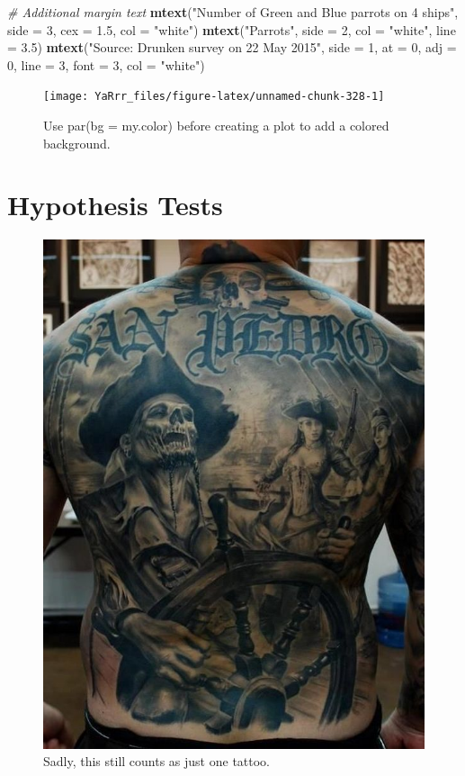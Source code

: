 \documentclass[]{book}
\newenvironment{Shaded}{\begin{snugshade}}{\end{snugshade}}
\newcommand{\KeywordTok}[1]{\textcolor[rgb]{0.13,0.29,0.53}{\textbf{#1}}}
\newcommand{\DataTypeTok}[1]{\textcolor[rgb]{0.13,0.29,0.53}{#1}}
\newcommand{\DecValTok}[1]{\textcolor[rgb]{0.00,0.00,0.81}{#1}}
\newcommand{\FloatTok}[1]{\textcolor[rgb]{0.00,0.00,0.81}{#1}}
\newcommand{\StringTok}[1]{\textcolor[rgb]{0.31,0.60,0.02}{#1}}
\newcommand{\CommentTok}[1]{\textcolor[rgb]{0.56,0.35,0.01}{\textit{#1}}}
\newcommand{\NormalTok}[1]{#1}
\theoremstyle{definition}
\theoremstyle{definition}
\theoremstyle{remark}
\begin{document}
\begin{Shaded}
\begin{Highlighting}[]
\CommentTok{# Additional margin text}
\KeywordTok{mtext}\NormalTok{(}\StringTok{"Number of Green and Blue parrots on 4 ships"}\NormalTok{, }
      \DataTypeTok{side =} \DecValTok{3}\NormalTok{, }\DataTypeTok{cex =} \FloatTok{1.5}\NormalTok{, }\DataTypeTok{col =} \StringTok{"white"}\NormalTok{)}
\KeywordTok{mtext}\NormalTok{(}\StringTok{"Parrots"}\NormalTok{, }\DataTypeTok{side =} \DecValTok{2}\NormalTok{, }\DataTypeTok{col =} \StringTok{"white"}\NormalTok{, }\DataTypeTok{line =} \FloatTok{3.5}\NormalTok{)}
\KeywordTok{mtext}\NormalTok{(}\StringTok{"Source: Drunken survey on 22 May 2015"}\NormalTok{, }\DataTypeTok{side =} \DecValTok{1}\NormalTok{,}
      \DataTypeTok{at =} \DecValTok{0}\NormalTok{, }\DataTypeTok{adj =} \DecValTok{0}\NormalTok{, }\DataTypeTok{line =} \DecValTok{3}\NormalTok{, }\DataTypeTok{font =} \DecValTok{3}\NormalTok{, }\DataTypeTok{col =} \StringTok{"white"}\NormalTok{)}
\end{Highlighting}
\end{Shaded}

\begin{figure}

{\centering \texttt{[image: YaRrr\_files/figure-latex/unnamed-chunk-328-1]} 

}

\caption{Use par(bg = my.color) before creating a plot to add a colored background.}\label{fig:unnamed-chunk-328}
\end{figure}

\chapter{Hypothesis Tests}\label{htests}

\begin{figure}

{\centering \includegraphics[width=0.4\linewidth]{images/piratetattoo} 

}

\caption{Sadly, this still counts as just one tattoo.}\label{fig:unnamed-chunk-330}
\end{figure}
\end{document}
